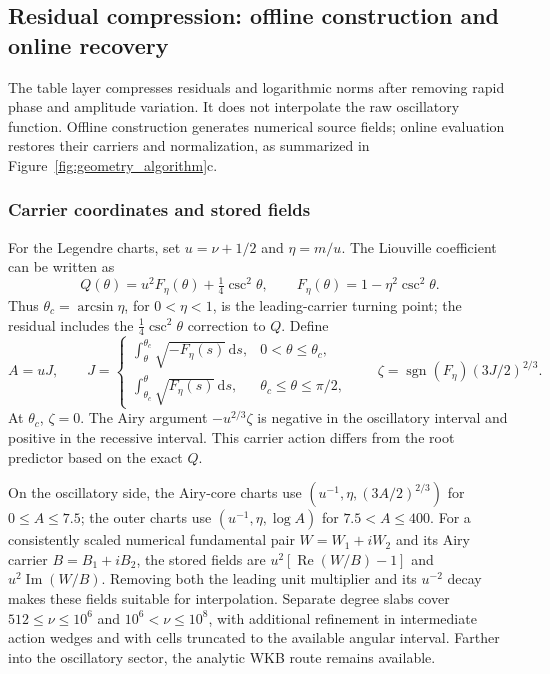 ﻿\documentclass[11pt,a4paper]{article}
\newcommand{\dd}{\mathrm{d}}
\begin{document}
\subsection{Residual compression: offline construction and online recovery}
\label{sec:canonical_residual_atlas}

The table layer compresses residuals and logarithmic norms after removing rapid phase and amplitude variation. It does not interpolate the raw oscillatory function. Offline construction generates numerical source fields; online evaluation restores their carriers and normalization, as summarized in Figure~\ref{fig:geometry_algorithm}c.

\subsubsection{Carrier coordinates and stored fields}

For the Legendre charts, set $u=\nu+1/2$ and $\eta=m/u$. The Liouville coefficient can be written as
\[
 Q(\theta)=u^2F_\eta(\theta)+\tfrac14\csc^2\theta,
 \qquad F_\eta(\theta)=1-\eta^2\csc^2\theta.
\]
Thus $\theta_c=\arcsin\eta$, for $0<\eta<1$, is the leading-carrier turning point; the residual includes the $\tfrac14\csc^2\theta$ correction to $Q$. Define
\begin{equation}
 A=uJ,\qquad
 J=\begin{cases}
 \displaystyle\int_\theta^{\theta_c}\sqrt{-F_\eta(s)}\,\dd s,
        &0<\theta\leq\theta_c,\\[2pt]
 \displaystyle\int_{\theta_c}^{\theta}\sqrt{F_\eta(s)}\,\dd s,
        &\theta_c\leq\theta\leq\pi/2,
 \end{cases}
 \qquad
 \zeta=\operatorname{sgn}(F_\eta)(3J/2)^{2/3}.
 \label{eq:atlas_action}
\end{equation}
At $\theta_c$, $\zeta=0$. The Airy argument $-u^{2/3}\zeta$ is negative in the oscillatory interval and positive in the recessive interval. This carrier action differs from the root predictor based on the exact $Q$.

On the oscillatory side, the Airy-core charts use $(u^{-1},\eta,(3A/2)^{2/3})$ for $0\leq A\leq7.5$; the outer charts use $(u^{-1},\eta,\log A)$ for $7.5<A\leq400$. For a consistently scaled numerical fundamental pair $W=W_1+iW_2$ and its Airy carrier $B=B_1+iB_2$, the stored fields are $u^2[\operatorname{Re}(W/B)-1]$ and $u^2\operatorname{Im}(W/B)$. Removing both the leading unit multiplier and its $u^{-2}$ decay makes these fields suitable for interpolation. Separate degree slabs cover $512\leq\nu\leq10^6$ and $10^6<\nu\leq10^8$, with additional refinement in intermediate action wedges and with cells truncated to the available angular interval. Farther into the oscillatory sector, the analytic WKB route remains available.
\end{document}
